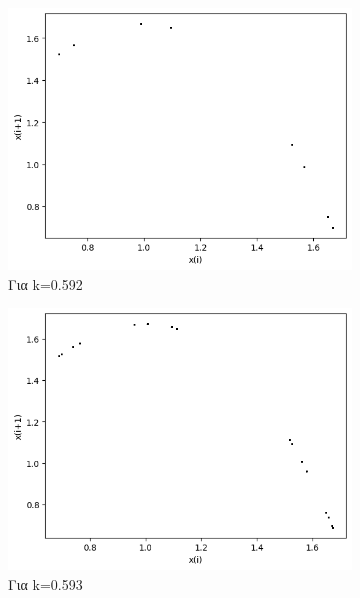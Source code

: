 \begin{figure}[h!]
\begin{subfigure}[b]{0.25\textwidth}
		\includegraphics[width=\textwidth]{LateX images/graphs q07/g7}
		\caption{Για k=0.592}
		\label{f:k41}
	\end{subfigure}
	\hfill
	\begin{subfigure}[b]{0.25\textwidth}
		\centering
		\includegraphics[width=\textwidth]{LateX images/graphs q07/g8}
		\caption{Για k=0.593}
		\label{f:k42}
	\end{subfigure}
	\hfill
	\begin{subfigure}[b]{0.25\textwidth}
		\centering

\end{subfigure}
\end{figure}
